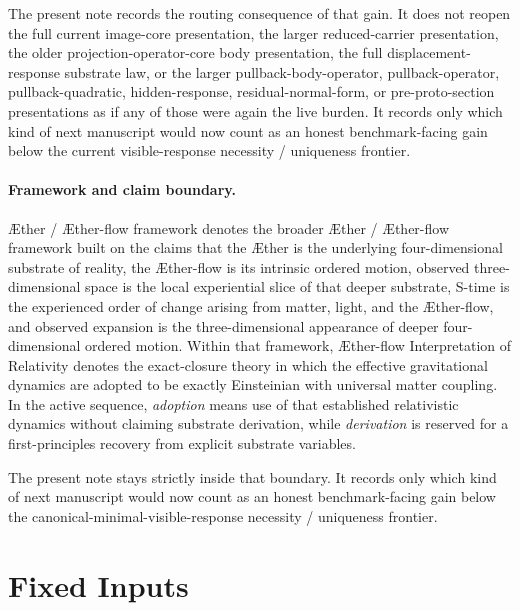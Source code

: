 \documentclass[11pt]{article}
\newcommand{\Aether}{\AE{}ther}
\newcommand{\Aflow}{\AE{}ther-flow}
\newcommand{\TheoryName}{\Aflow{} Interpretation of Relativity}
\newcommand{\TheoryProgram}{\Aether{} / \Aflow{} framework}
\begin{document}
The present note records the routing consequence of that gain. It does not reopen the full current image-core presentation, the larger reduced-carrier presentation, the older projection-operator-core body presentation, the full displacement-response substrate law, or the larger pullback-body-operator, pullback-operator, pullback-quadratic, hidden-response, residual-normal-form, or pre-proto-section presentations as if any of those were again the live burden. It records only which kind of next manuscript would now count as an honest benchmark-facing gain below the current visible-response necessity / uniqueness frontier.

\paragraph{Framework and claim boundary.}
\TheoryProgram{} denotes the broader \Aether{} / \Aflow{} framework built on the claims that the \Aether{} is the underlying four-dimensional substrate of reality, the \Aflow{} is its intrinsic ordered motion, observed three-dimensional space is the local experiential slice of that deeper substrate, S-time is the experienced order of change arising from matter, light, and the \Aflow{}, and observed expansion is the three-dimensional appearance of deeper four-dimensional ordered motion. Within that framework, \TheoryName{} denotes the exact-closure theory in which the effective gravitational dynamics are adopted to be exactly Einsteinian with universal matter coupling. In the active sequence, \emph{adoption} means use of that established relativistic dynamics without claiming substrate derivation, while \emph{derivation} is reserved for a first-principles recovery from explicit substrate variables.

The present note stays strictly inside that boundary. It records only which kind of next manuscript would now count as an honest benchmark-facing gain below the canonical-minimal-visible-response necessity / uniqueness frontier.

\section{Fixed Inputs}
\end{document}
